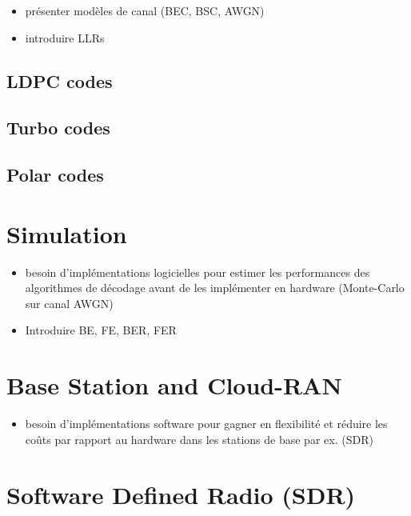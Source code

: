 \begin{itemize}
  \item présenter modèles de canal (BEC, BSC, AWGN)
  \item introduire LLRs
\end{itemize}

\subsection{LDPC codes}

\subsection{Turbo codes}

\subsection{Polar codes}

\section{Simulation}

\begin{itemize}
  \item besoin d'implémentations logicielles pour estimer les performances des
        algorithmes de décodage avant de les implémenter en hardware
        (Monte-Carlo sur canal AWGN)
  \item Introduire BE, FE, BER, FER
\end{itemize}

\section{Base Station and Cloud-RAN}

\begin{itemize}
  \item besoin d'implémentations software pour gagner en flexibilité et réduire
        les coûts par rapport au hardware dans les stations de base par ex.
        (SDR)
\end{itemize}

\section{Software Defined Radio (SDR)}